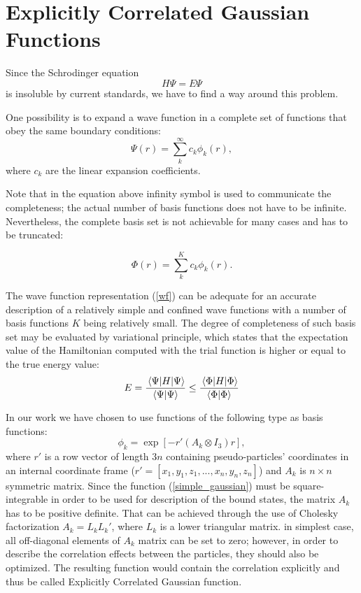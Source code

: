 \section{Explicitly Correlated Gaussian Functions}

Since the Schrodinger equation 
\begin{equation}
H \Psi = E \Psi
\end{equation}
is insoluble by current standards, we have to find a way
around this problem.

One possibility is to expand a wave function in a complete 
set of functions that obey the same boundary conditions:
\begin{equation}
\Psi (r) = \sum_k^{\infty} c_k \phi_k(r),
\end{equation}
where $c_k$ are the linear expansion coefficients.

Note that in the equation above infinity symbol is used to 
communicate the completeness; the actual number of basis functions
does not have to be infinite. Nevertheless, the complete basis
set is not achievable for many cases and has to be truncated:

\begin{equation}
\Phi (r) = \sum_k^{K} c_k \phi_k(r).
\label{wf}
\end{equation}

The wave function representation (\ref{wf}) can be adequate for
an accurate description of a relatively simple and confined 
wave functions with a number of basis functions $K$ being
relatively small. The degree of completeness of such basis set 
may be evaluated by variational principle, which states that 
the expectation value of the Hamiltonian computed with the 
trial function is higher or equal to the true energy value:
\begin{equation}
E = \frac{\expval{H}{\Psi}}{\bra{\Psi}\ket{\Psi}} \leq 
\frac{\expval{H}{\Phi}}{\bra{\Phi}\ket{\Phi}}
\label{var_principle}
\end{equation}

In our work we have chosen to use functions of the following type
as basis functions:
\begin{equation}
\phi_k = \exp \left[ - r' (A_k \otimes I_3) r \right],
\label{simple_gaussian}
\end{equation}
where $r'$ is a row vector of length $3n$ containing pseudo-particles'
coordinates in an internal coordinate frame ($r'=[x_1,y_1,z_1,...,x_n,y_n,z_n]$)
and $A_k$ is $n\times n$ symmetric matrix. Since the function (\ref{simple_gaussian})
must be square-integrable in order to be used for description of the bound states,
the matrix $A_k$ has to be positive definite. That can be achieved through the use
of Cholesky factorization $A_k=L_k L_k'$, where $L_k$ is a lower triangular matrix.
in simplest case, all off-diagonal elements of $A_k$ matrix can be set to zero;
however, in order to describe the correlation effects between the particles,
they should also be optimized. The resulting function would contain the correlation
explicitly and thus be called Explicitly Correlated Gaussian function.

